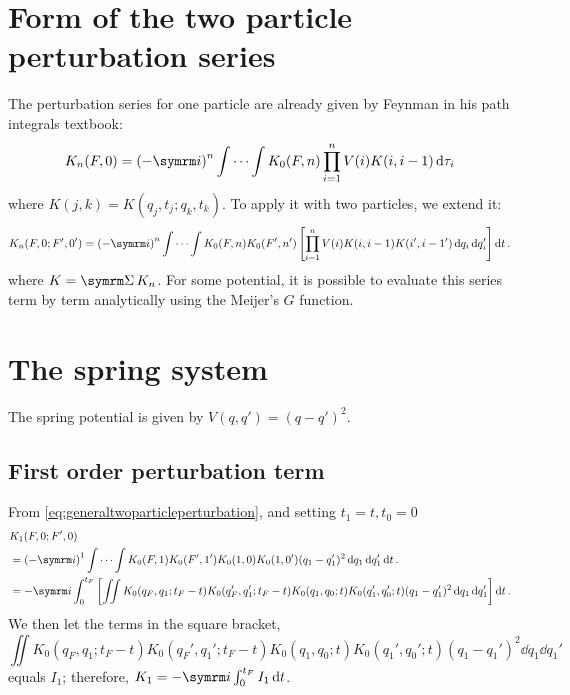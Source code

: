 \section{Form of the two particle perturbation series}

The perturbation series for one particle are already given by Feynman in his path integrals textbook:
\begin{equation}
    K_n(F, 0) = \left(-\im\right)^n\idotsint K_0(F, n)\prod_{i = 1}^n V(i)K(i, i - 1)\dd{\tau_i}
\end{equation}
where $K(j, k) = K(q_j, t_j; q_k, t_k)$. To apply it with two particles, we extend it:
\begin{equation}
    K_n(F, 0; F', 0') = \left(-\im\right)^n\idotsint K_0(F, n)K_0(F', n')\left[\prod_{i = 1}^nV(i)K(i, i - 1)K(i', i - 1')\dd{q_i}\dd{q_i'}\right]\dd{t}. \label{eq:generaltwoparticleperturbation}
\end{equation}
where $K = \ssum K_n$. For some potential, it is possible to evaluate this series term by term analytically using the Meijer's $G$ function.

\section{The spring system}

The spring potential is given by $V(q, q') = (q - q')^2.$

\subsection{First order perturbation term}
\label{sec:spring_1storder}

From \cref{eq:generaltwoparticleperturbation}, and setting $t_1 = t, t_0 = 0$
\begin{align}
    &K_1(F, 0; F', 0) \nonumber \\
    &= \left(-\im\right)^1\idotsint K_0(F, 1)K_0(F', 1')K_0(1, 0)K_0(1, 0')(q_1 - q_1')^2\dd{q_1}\dd{q_1'}\dd{t}. \\
    &= -\im\int_0^{t_F}\left[\iint K_0(q_F, q_1; t_F - t)K_0(q_F', q_1'; t_F - t)K_0(q_1, q_0; t)K_0(q_1', q_0'; t)(q_1 - q_1')^2\dd{q_1}\dd{q_1'}\right]\dd{t}. \nonumber
\end{align}
We then let the terms in the square bracket,
\begin{equation}
    \iint K_0(q_F, q_1; t_F - t)K_0(q_F', q_1'; t_F - t)K_0(q_1, q_0; t)K_0(q_1', q_0'; t)(q_1 - q_1')^2\dd{q_1}\dd{q_1'}
\end{equation}
equals $I_1$; therefore, $K_1 = -\im\int_0^{t_F} I_1\dd{t}$.

